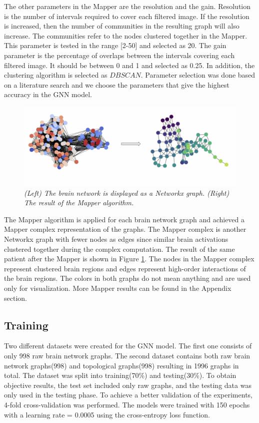 \documentclass[runningheads]{llncs}
\begin{document}
The other parameters in the Mapper are the resolution and the gain. Resolution is the number of intervals required to cover each filtered image. If the resolution is increased, then the number of communities in the resulting graph will also increase. The communities refer to the nodes clustered together in the Mapper. This parameter is tested in the range [2-50] and selected as 20. The gain parameter is the percentage of overlaps between the intervals covering each filtered image. It should be between 0 and 1 and selected as 0.25. In addition, the clustering algorithm is selected as $DBSCAN$. Parameter selection was done based on a literature search and we choose the parameters that give the highest accuracy in the GNN model. 

%
\begin{figure}[!ht]
  \centering
  \includegraphics[width=12cm]{images/after_mapper.png}
  \caption{\textit{(Left) The brain network is displayed as a Networkx graph. (Right) The result of the Mapper algorithm. }}
  \label{after_mapper}
\end{figure}
%

The Mapper algorithm is applied for each brain network graph and achieved a Mapper complex representation of the graphs. The Mapper complex is another Networkx graph with fewer nodes as edges since similar brain activations clustered together during the complex computation. The result of the same patient after the Mapper is shown in Figure \ref{after_mapper}. The nodes in the Mapper complex represent clustered brain regions and edges represent high-order interactions of the brain regions. The colors in both graphs do not mean anything and are used only for visualization. More Mapper results can be found in the Appendix section.


\subsection{Training}
 Two different datasets were created for the GNN model. The first one consists of only 998 raw brain network graphs. The second dataset contains both raw brain network graphs(998) and topological graphs(998) resulting in 1996 graphs in total. The dataset was split into training(70\%) and testing(30\%). To obtain objective results, the test set included only raw graphs, and the testing data was only used in the testing phase. To achieve a better validation of the experiments, 4-fold cross-validation was performed. The models were trained
with 150 epochs with a learning rate = 0.0005 using the cross-entropy loss function.
\end{document}

